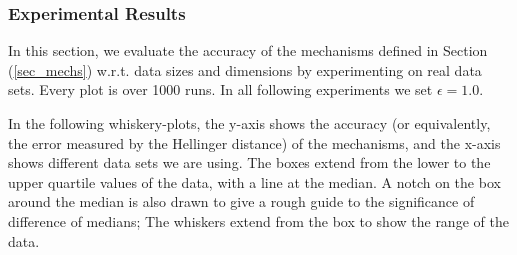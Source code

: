 \documentclass{article}
\begin{document}
\subsubsection{Experimental Results}
\label{subsec_vs_variables}

In this section, we evaluate the accuracy of the mechanisms defined in
Section (\ref{sec_mechs}) w.r.t. data sizes and dimensions by experimenting on real data sets.
Every plot is over 1000 runs. In all following experiments we set
$\epsilon = 1.0$.

\noindent In the following whiskery-plots, the y-axis shows the
accuracy (or equivalently, the error measured by the Hellinger distance) of the mechanisms, and the x-axis shows
different data sets we are using. The boxes extend from the lower to the upper quartile values
of the data, with a line at the median. A notch on the box around the
median is also drawn to give a rough guide to the significance of
difference of medians; The whiskers extend from the box to show the
range of the data. 




\end{document}
